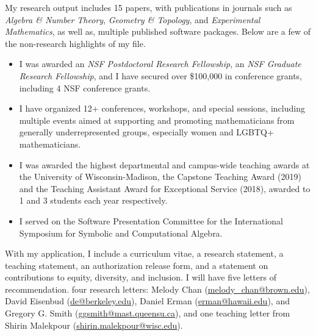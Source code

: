 \documentclass[11pt]{article}
\begin{document}
My research output includes 15 papers, with publications in journals such as \textit{Algebra \& Number Theory}, \textit{Geometry \& Topology}, and \textit{Experimental Mathematics}, as well as, multiple published software packages. Below are a few of the non-research highlights of my file.

\begin{itemize}[leftmargin=*]
\item I was awarded an \textit{NSF Postdoctoral Research Fellowship}, an \textit{NSF Graduate Research Fellowship}, and I have secured over \$100,000 in conference grants, including 4 NSF conference grants. 
\item I have organized 12+ conferences, workshops, and special sessions, including multiple events aimed at supporting and promoting mathematicians from generally underrepresented groups, especially women and LGBTQ+ mathematicians. 
\item I was awarded the highest departmental and campus-wide teaching awards at the University of Wisconsin-Madison, the Capstone Teaching Award (2019) and the Teaching Assistant Award for Exceptional Service (2018), awarded to 1 and 3 students each year respectively. 
 \item I served on the Software Presentation Committee for the International Symposium for Symbolic and Computational Algebra.
\end{itemize}



With my application, I include a curriculum vitae, a research statement, a teaching statement, an authorization release form, and a statement on contributions to equity, diversity, and inclusion. I will have five letters of recommendation. four research letters: Melody Chan (\href{mailto:melody\_chan@brown.edu}{melody\_chan@brown.edu}), David Eisenbud  (\href{mailto:de@berkeley.edu
}{de@berkeley.edu}), Daniel Erman (\href{mailto:erman@hawaii.edu}{erman@hawaii.edu}), and Gregory G. Smith (\href{mailto:ggsmith@mast.queensu.ca}{ggsmith@mast.queensu.ca}), and one teaching letter from Shirin Malekpour (\href{mailto:shirin.malekpour@wisc.edu}{shirin.malekpour@wisc.edu}).  
\end{document}

